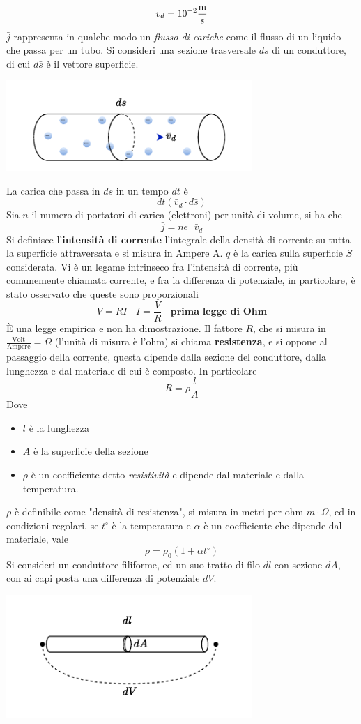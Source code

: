 \documentclass[10pt, letterpaper]{report}
\begin{document}
$$ v_d=10^{-2}\frac{\text m}{\text s}$$
$\bar j$ rappresenta in qualche modo un \textit{flusso di cariche} come il flusso di un liquido che passa per un tubo. Si consideri una sezione trasversale $ds$ di un conduttore, di cui $d\bar s$ è il vettore superficie.\begin{center}
    \includegraphics[width=0.7\textwidth]{images/correnteAttraversaSezione.drawio.pdf}
\end{center}
La carica che passa in $ds$ in un tempo $dt$ è $$dt(\bar v_d\cdot d\bar s)$$
Sia $n$ il numero di portatori di carica (elettroni) per unità di volume, si ha che 
$$ \bar j = ne^-\bar v_d$$
Si definisce l'\textbf{intensità di corrente} l'integrale della densità di corrente su tutta la superficie attraversata 
e si misura in Ampere A. $q$ è la carica sulla superficie $S$ considerata. \acc 
Vi è un legame intrinseco fra l'intensità di corrente, più comunemente chiamata corrente, e fra la differenza di potenziale, in particolare, è stato osservato che queste sono proporzionali 
$$ V=RI\ \ \ \ I=\frac{V}{R}\ \ \ \ \textbf{prima legge di Ohm}$$
È una legge empirica e non ha dimostrazione.
Il fattore $R$, che si misura in $\frac{\text{Volt}}{\text{Ampere}}=\Omega$ (l'unità di misura è l'ohm) si chiama \textbf{resistenza}, e si oppone al passaggio della corrente, questa dipende dalla sezione del conduttore, dalla lunghezza e dal materiale di cui è composto. In particolare 
$$ R=\rho \frac{l}{A}$$
Dove \begin{itemize}
    \item $l$ è la lunghezza 
    \item $A$ è la superficie della sezione 
    \item $\rho$ è un coefficiente detto \textit{resistività} e dipende dal materiale e dalla temperatura.
\end{itemize}
$\rho$ è definibile come "densità di resistenza", si misura in metri per ohm $m\cdot\Omega$, ed in condizioni regolari, se $t^\circ$ è la temperatura e $\alpha$ è un coefficiente che dipende dal materiale, vale 
$$ \rho=\rho_0(1+\alpha t^\circ)$$
Si consideri un conduttore filiforme, ed un suo tratto di filo $dl$ con sezione $dA$, con ai capi posta una differenza di potenziale $dV$.\begin{center}
    \includegraphics[width=0.7\textwidth]{images/tratttofilo.pdf}
\end{center}
\end{document}

